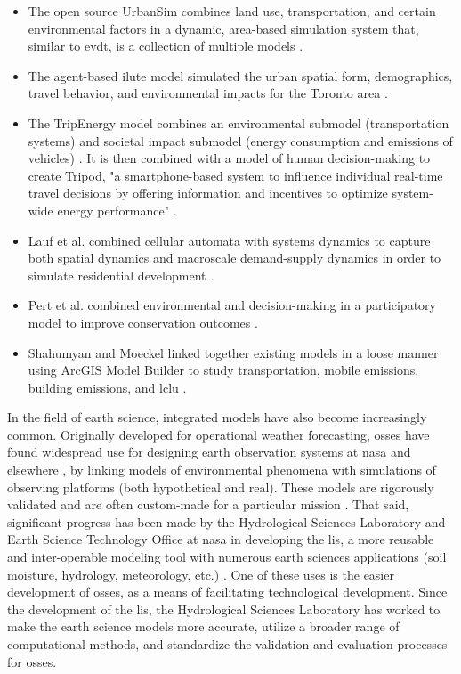 \begin{itemize} \setlength{\itemsep}{0pt} \setlength{\parskip}{0pt}
	\item{The open source UrbanSim combines land use, transportation, and certain environmental factors in a dynamic, area-based simulation system that, similar to \ac{evdt}, is a collection of multiple models \cite{waddellUrbanSimModelingUrban2002}.}
	\item{The agent-based \ac{ilute} model simulated the urban spatial form, demographics, travel behavior, and environmental impacts for the Toronto area \cite{millerHistoricalValidationIntegrated2011}.}
	\item{The TripEnergy model combines an environmental submodel (transportation systems) and societal impact submodel (energy consumption and emissions of vehicles) \cite{needellEfficientlySimulatingPersonal2018}. It is then combined with a model of human decision-making to create Tripod, "a smartphone-based system to influence individual real-time travel decisions by offering information and incentives to optimize system-wide energy performance" \cite{azevedoTripodSustainableTravel2018}.}
	\item{Lauf et al. combined cellular automata with systems dynamics to capture both spatial dynamics and macroscale demand-supply dynamics in order to simulate residential development \cite{laufUncoveringLanduseDynamics2012}.}
	\item{Pert et al. combined environmental and decision-making in a participatory model to improve conservation outcomes \cite{pertParticipatoryDevelopmentNew2013}.}
	\item{Shahumyan and Moeckel linked together existing models in a loose manner using ArcGIS Model Builder to study transportation, mobile emissions, building emissions, and \ac{lclu} \cite{shahumyanIntegrationLandUse2017}.}
\end{itemize} 

In the field of earth science, integrated models have also become increasingly common. Originally developed for operational weather forecasting, \acp{osse} have found widespread use for designing earth observation systems at \ac{nasa} and elsewhere \cite{masutaniObservingSystemSimulation2010}, by linking models of environmental phenomena with simulations of observing platforms (both hypothetical and real). These models are rigorously validated and are often custom-made for a particular mission \cite{erricoDevelopmentValidationObservingsystem2013}. That said, significant progress has been made by the Hydrological Sciences Laboratory and Earth Science Technology Office at \ac{nasa} in developing the \ac{lis}, a more reusable and inter-operable modeling tool with numerous earth sciences applications (soil moisture, hydrology, meteorology, etc.) \cite{kumarMissionSimulationEvaluation2015}. One of these uses is the easier development of \acp{osse}, as a means of facilitating technological development. Since the development of the \ac{lis}, the Hydrological Sciences Laboratory has worked to make the earth science models more accurate, utilize  a broader range of computational methods, and standardize the validation and evaluation processes for \acp{osse}.

